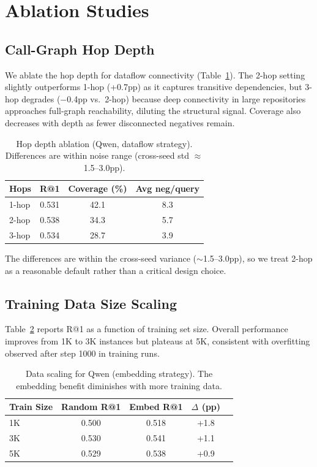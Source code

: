 \documentclass[11pt,a4paper]{article}
\begin{document}
\section{Ablation Studies}
\label{sec:ablations}

\subsection{Call-Graph Hop Depth}
\label{sec:hops}

We ablate the hop depth for dataflow connectivity (Table~\ref{tab:hops}). The 2-hop setting slightly outperforms 1-hop (+0.7pp) as it captures transitive dependencies, but 3-hop degrades ($-$0.4pp vs.\ 2-hop) because deep connectivity in large repositories approaches full-graph reachability, diluting the structural signal. Coverage also decreases with depth as fewer disconnected negatives remain.

\begin{table}[t]
\centering
\small
\begin{tabular}{lccc}
\toprule
\textbf{Hops} & \textbf{R@1} & \textbf{Coverage (\%)} & \textbf{Avg neg/query} \\
\midrule
1-hop & 0.531 & 42.1 & 8.3 \\
2-hop & 0.538 & 34.3 & 5.7 \\
3-hop & 0.534 & 28.7 & 3.9 \\
\bottomrule
\end{tabular}
\caption{Hop depth ablation (Qwen, dataflow strategy). Differences are within noise range (cross-seed std $\approx$ 1.5--3.0pp).}
\label{tab:hops}
\end{table}

The differences are within the cross-seed variance ($\sim$1.5--3.0pp), so we treat 2-hop as a reasonable default rather than a critical design choice.

\subsection{Training Data Size Scaling}
\label{sec:scaling}

Table~\ref{tab:scaling} reports R@1 as a function of training set size. Overall performance improves from 1K to 3K instances but plateaus at 5K, consistent with overfitting observed after step 1000 in training runs.

\begin{table}[t]
\centering
\small
\begin{tabular}{lcccc}
\toprule
\textbf{Train Size} & \textbf{Random R@1} & \textbf{Embed R@1} & \textbf{$\Delta$ (pp)} \\
\midrule
1K & 0.500 & 0.518 & +1.8 \\
3K & 0.530 & 0.541 & +1.1 \\
5K & 0.529 & 0.538 & +0.9 \\
\bottomrule
\end{tabular}
\caption{Data scaling for Qwen (embedding strategy). The embedding benefit diminishes with more training data.}
\label{tab:scaling}
\end{table}
\end{document}
